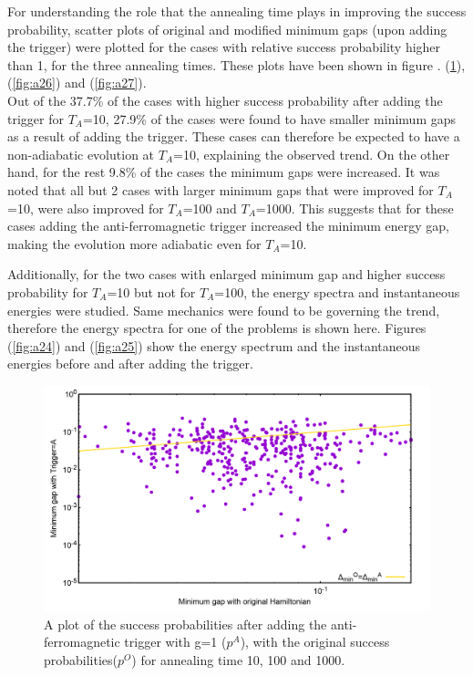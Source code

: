 \documentclass[12]{article}
\begin{document}
For understanding the role that the annealing time plays in improving the success probability, scatter plots of original and modified minimum gaps (upon adding the trigger) were plotted for the cases with relative success probability higher than 1, for the three annealing times. These plots have been shown in figure .
(\ref{fig:a23}), (\ref{fig:a26}) and (\ref{fig:a27}).\\

Out of the 37.7\% of the cases with higher success probability after adding the trigger for $T_A$=10, 27.9\% of the cases were found to have smaller minimum gaps as a result of adding the trigger. These cases can therefore be expected to have a non-adiabatic evolution at $T_A$=10, explaining the observed trend. On the other hand, for the rest 9.8\% of the cases the minimum gaps were increased. It was noted that all but 2 cases with larger minimum gaps that were improved for $T_A$=10, were also improved for $T_A$=100 and $T_A$=1000. This suggests that for these cases adding the anti-ferromagnetic trigger increased the minimum energy gap, making the evolution more adiabatic even for $T_A$=10. 

Additionally, for the two cases with enlarged minimum gap and higher success probability for $T_A$=10 but not for $T_A$=100, the energy spectra and instantaneous energies were studied. Same mechanics were found to be governing the trend, therefore the energy spectra for one of the problems is shown here. Figures (\ref{fig:a24}) and (\ref{fig:a25}) show the energy spectrum and the instantaneous energies before and after adding the trigger.

\begin{figure}[H]
\centering 
\includegraphics[scale=0.26]{selected_T10_g1.png}
\caption{A plot of the success probabilities after adding the anti-ferromagnetic trigger with g=1 ($p^A$), with the original success probabilities($p^O$) for annealing time 10, 100 and 1000.}
\label{fig:a23}
\end{figure}
\end{document}
